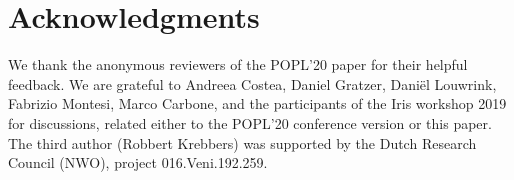 \section*{Acknowledgments}

We thank the anonymous reviewers of the POPL'20 paper for their helpful feedback.
We are grateful to Andreea Costea, Daniel Gratzer, Dani\"el Louwrink, Fabrizio Montesi,
Marco Carbone,
and the participants of the Iris workshop 2019 for discussions, related either
to the POPL'20 conference version or this paper.
The third author (Robbert Krebbers) was supported by the Dutch Research Council (NWO), project 016.Veni.192.259.
